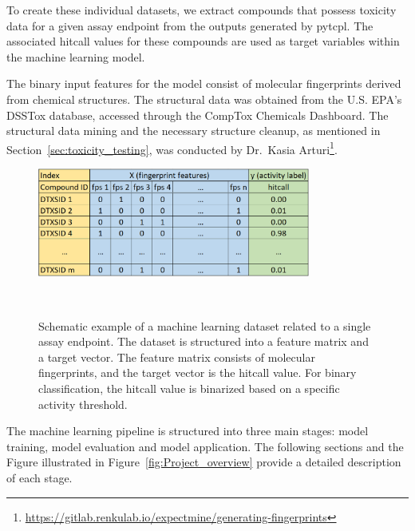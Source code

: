 To create these individual datasets, we extract compounds that possess toxicity data for a given assay endpoint from the outputs generated by pytcpl. The associated hitcall values for these compounds are used as target variables within the machine learning model.

The binary input features for the model consist of molecular fingerprints derived from chemical structures. The structural data was obtained from the U.S. EPA's DSSTox database, accessed through the CompTox Chemicals Dashboard. The structural data mining and the necessary structure cleanup, as mentioned in Section~\ref{sec:toxicity_testing}, was conducted by Dr.\ Kasia Arturi\footnote{\url{https://gitlab.renkulab.io/expectmine/generating-fingerprints}}.

\begin{figure} 
    \centering
    \includegraphics[width=0.8\textwidth]{figures/ml_dataset.png}
    \caption{Schematic example of a machine learning dataset related to a single assay endpoint. The dataset is structured into a feature matrix and a target vector. The feature matrix consists of molecular fingerprints, and the target vector is the hitcall value. For binary classification, the hitcall value is binarized based on a specific activity threshold.}
~\label{fig:ml_dataset}
\end{figure}


The machine learning pipeline is structured into three main stages: model training, model evaluation and model application. The following sections and the Figure illustrated in Figure~\ref{fig:Project_overview} provide a detailed description of each stage.

